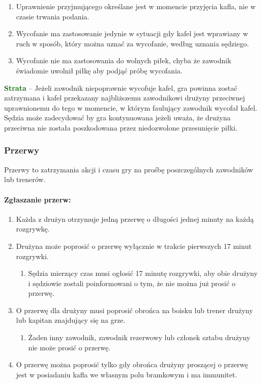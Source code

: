 \documentclass[12pt]{article}
\newcommand\other[1]{\bgroup\textcolor{darkgreen}{\textbf{#1}}}
\begin{document}
\begin{enumerate}
	\item
	      Uprawnienie przyjmującego określane jest w momencie przyjęcia kafla,
	      nie w czasie trwania podania.
	\item
	      Wycofanie ma zastosowanie jedynie w sytuacji gdy kafel jest wprawiany
	      w ruch w sposób, który można uznać za wycofanie, według uznania
	      sędziego.
	\item
	      Wycofanie nie ma zastosowania do wolnych piłek, chyba że zawodnik
	      świadomie uwolnił piłkę aby podjąć próbę wycofania.
\end{enumerate}

\other{Strata} -- Jeżeli zawodnik niepoprawnie wycofuje kafel, gra powinna
zostać zatrzymana i kafel przekazany najbliższemu zawodnikowi drużyny
przeciwnej uprawnionemu do tego w momencie, w którym faulujący zawodnik
wycofał kafel. Sędzia może zadecydować by gra kontynuowana jeżeli uważa,
że drużyna przeciwna nie została poszkodowana przez niedozwolone
przesunięcie piłki.

\subsubsection{Przerwy}

Przerwy to zatrzymania akcji i czasu gry na prośbę poszczególnych
zawodników lub trenerów.

\paragraph{Zgłaszanie przerw:}

\begin{enumerate}
	\item
	      Każda z drużyn otrzymuje jedną przerwę o długości jednej minuty na
	      każdą rozgrywkę.
	\item
	      Drużyna może poprosić o przerwę wyłącznie w trakcie pierwszych 17
	      minut rozgrywki.

	      \begin{enumerate}
		      \item
		            Sędzia mierzący czas musi ogłosić 17 minutę rozgrywki, aby obie
		            drużyny i sędziowie zostali poinformowani o tym, że nie można już
		            prosić o przerwę.
	      \end{enumerate}
	\item
	      O przerwę dla drużyny musi poprosić obrońca na boisku lub trener
	      drużyny lub kapitan znajdujący się na grze.

	      \begin{enumerate}
		      \item
		            Żaden inny zawodnik, zawodnik rezerwowy lub członek sztabu drużyny
		            nie może prosić o przerwę.
	      \end{enumerate}
	\item
	      O przerwę można poprosić tylko gdy obrońca drużyny proszącej o przerwę
	      jest w posiadaniu kafla we własnym polu bramkowym i ma immunitet.
\end{enumerate}
\end{document}
